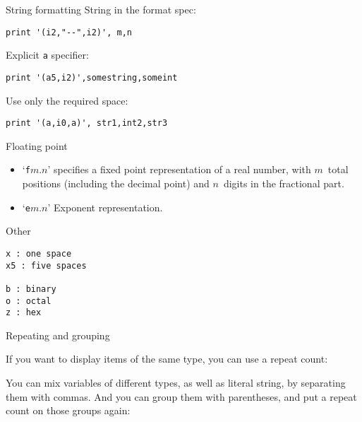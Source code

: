\begin{slide}{String formatting}
  \label{sl:f-format-f}
  String in the format spec:
\begin{lstlisting}
print '(i2,"--",i2)', m,n
\end{lstlisting}
Explicit \lstinline{a} specifier:
\begin{lstlisting}
print '(a5,i2)',somestring,someint
\end{lstlisting}
Use only the required space:
\begin{lstlisting}
print '(a,i0,a)', str1,int2,str3
\end{lstlisting}
\end{slide}

 {Floating point}

\begin{itemize}
\item `\lstinline{f}$m.n$' specifies a fixed point representation of a real
  number, with $m$~total positions (including the decimal point)
  and $n$~digits in the fractional part.
\item `\lstinline{e}$m.n$' Exponent representation.
\end{itemize}

 {Other}

\begin{verbatim}
x : one space
x5 : five spaces

b : binary
o : octal
z : hex
\end{verbatim}

 {Repeating and grouping}

If you want to display items of the same type, you can use a repeat
count:
%

You can mix variables of different types, as well as literal string,
by separating them with commas. And you can group them with
parentheses, and put a repeat count on those groups again:
%

